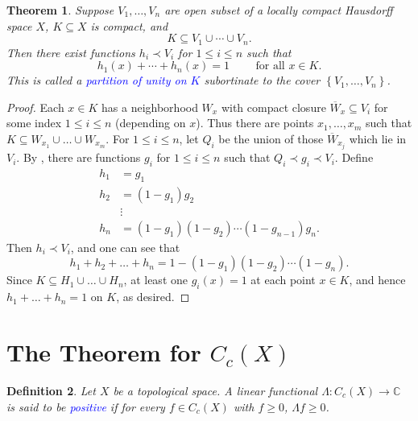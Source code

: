 \documentclass[11pt]{article}
\theoremstyle{thmstyle}
\newtheorem{theorem}{Theorem}[section]
\theoremstyle{defstyle}
\newtheorem{definition}[theorem]{Definition}
\newcommand{\bbC}{\mathbb{C}}
\newcommand{\define}[1]{\textcolor{blue}{\textit{#1}}}
\renewcommand{\le}{\leqslant}
\renewcommand{\ge}{\geqslant}
\begin{document}
\begin{theorem}
    Suppose $V_1,\dots, V_n$ are open subset of a locally compact Hausdorff space $X$, $K\subseteq X$ is compact, and 
    \begin{equation*}
        K\subseteq V_1\cup \cdots\cup V_n.
    \end{equation*}
    Then there exist functions $h_i\prec V_i$ for $1\le i\le n$ such that 
    \begin{equation*}
        h_1(x) + \cdots + h_n(x) = 1\qquad\text{ for all }x\in K.
    \end{equation*}
    This is called a \define{partition of unity on $K$} subortinate to the cover $\left\{V_1, \dots, V_n\right\}$.
\end{theorem}
\begin{proof}
    Each $x\in K$ has a neighborhood $W_x$ with compact closure $\overline W_x\subseteq V_i$ for some index $1\le i\le n$ (depending on $x$). Thus there are points $x_1,\dots, x_m$ such that $K\subseteq W_{x_1}\cup\dots\cup W_{x_m}$. For $1\le i\le n$, let $Q_i$ be the union of those $\overline{W}_{x_j}$ which lie in $V_i$. By , there are functions $g_i$ for $1\le i\le n$ such that $Q_i\prec g_i\prec V_i$. Define 
    \begin{align*}
        h_1 &= g_1\\
        h_2 &= (1 - g_1)g_2\\
        &\vdots\\
        h_n &= (1 - g_1)(1 - g_2)\cdots(1 - g_{n - 1})g_n.
    \end{align*}
    Then $h_i\prec V_i$, and one can see that 
    \begin{equation*}
        h_1 + h_2 + \dots + h_n = 1 - (1 - g_1)(1 - g_2)\cdots(1 - g_n). 
    \end{equation*}
    Since $K\subseteq H_1\cup\dots\cup H_n$, at least one $g_i(x) = 1$ at each point $x\in K$, and hence $h_1 + \dots + h_n = 1$ on $K$, as desired.
\end{proof}

\section{The Theorem for \texorpdfstring{$C_c(X)$}{Cc(X)}}

\begin{definition}
    Let $X$ be a topological space. A linear functional $\Lambda\colon C_c(X)\to\bbC$ is said to be \define{positive} if for every $f\in C_c(X)$ with $f\ge 0$, $\Lambda f\ge 0$.
\end{definition}
\end{document}
